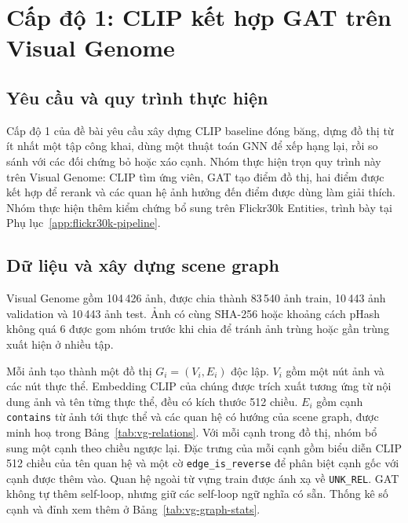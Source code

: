 \chapter{Cấp độ 1: CLIP kết hợp GAT trên Visual Genome}
\label{chap:level1}
\label{chap:methodology}

\section{Yêu cầu và quy trình thực hiện}
\label{sec:level1-methodology}

Cấp độ 1 của đề bài yêu cầu xây dựng CLIP baseline đóng băng, dựng đồ thị từ ít nhất một tập công khai, dùng một thuật toán GNN để xếp hạng lại, rồi so sánh với các đối chứng bỏ hoặc xáo cạnh. Nhóm thực hiện trọn quy trình này trên Visual Genome: CLIP tìm ứng viên, GAT tạo điểm đồ thị, hai điểm được kết hợp để rerank và các quan hệ ảnh hưởng đến điểm được dùng làm giải thích. Nhóm thực hiện thêm kiểm chứng bổ sung trên Flickr30k Entities, trình bày tại Phụ lục~\ref{app:flickr30k-pipeline}.

\section{Dữ liệu và xây dựng scene graph}
\label{sec:vg-experimental-design}
\label{sec:static-graph}

Visual Genome gồm 104\,426 ảnh, được chia thành 83\,540 ảnh train, 10\,443 ảnh validation và 10\,443 ảnh test. Ảnh có cùng SHA-256 hoặc khoảng cách pHash không quá 6 được gom nhóm trước khi chia để tránh ảnh trùng hoặc gần trùng xuất hiện ở nhiều tập.

Mỗi ảnh tạo thành một đồ thị $G_i=(V_i,E_i)$ độc lập. $V_i$ gồm một nút ảnh và các nút thực thể.
Embedding CLIP của chúng được trích xuất
tương ứng từ nội dung ảnh và tên từng thực thể,
đều có kích thước 512 chiều. $E_i$ gồm cạnh \texttt{contains} từ ảnh tới thực thể và các quan hệ có hướng của scene graph, được minh hoạ trong Bảng~\ref{tab:vg-relations}. Với mỗi cạnh trong đồ thị, nhóm bổ sung một cạnh theo chiều ngược lại. Đặc trưng của mỗi cạnh gồm biểu diễn CLIP 512 chiều của tên quan hệ và một cờ \texttt{edge\_is\_reverse} để phân biệt cạnh gốc với cạnh được thêm vào. Quan hệ ngoài từ vựng train được ánh xạ về \texttt{UNK\_REL}. GAT không tự thêm self-loop, nhưng giữ các self-loop ngữ nghĩa có sẵn. Thống kê số cạnh và đỉnh xem thêm ở Bảng~\ref{tab:vg-graph-stats}.

